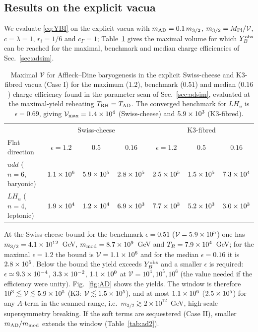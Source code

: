 \documentclass[11pt]{article}
\newcommand{\MP}{M_{\rm Pl}}
\begin{document}
\subsection{Results on the explicit vacua}
We evaluate \eqref{eq:YBI} on the explicit vacua with $m_{\rm AD}=0.1\,m_{3/2}$, $m_{3/2}=\MP/\mathcal V$, $c=\lambda=1$, $r_i=1/6$ and $c_\Gamma=1$; Table~\ref{tab:ad} gives the maximal volume for which $Y_B^{\rm obs}$ can be reached for the maximal, benchmark and median charge efficiencies of Sec.~\ref{sec:adsim}.
\begin{table}[t]
\centering\scriptsize
\begin{tabular}{l|ccc|ccc}
\toprule
 & \multicolumn{3}{c|}{Swiss-cheese} & \multicolumn{3}{c}{K3-fibred}\\
Flat direction & $\epsilon=1.2$ & $0.5$ & $0.16$ & $\epsilon=1.2$ & $0.5$ & $0.16$\\
\midrule
$udd$ ($n=6$, baryonic) & $1.1\times10^{6}$ & $5.9\times10^{5}$ & $2.8\times10^{5}$ & $2.5\times10^{5}$ & $1.5\times10^{5}$ & $7.3\times10^{4}$\\
$LH_u$ ($n=4$, leptonic) & $1.9\times10^{4}$ & $1.2\times10^{4}$ & $6.9\times10^{3}$ & $7.7\times10^{3}$ & $5.2\times10^{3}$ & $3.0\times10^{3}$\\
\bottomrule
\end{tabular}
\caption{Maximal $\mathcal V$ for Affleck--Dine baryogenesis in the explicit Swiss-cheese and K3-fibred vacua (Case I) for the maximum ($1.2$), benchmark ($0.51$) and median ($0.16$) charge efficiency found in the parameter scan of Sec.~\ref{sec:adsim}, evaluated at the maximal-yield reheating $T_{\rm RH}=T_{\rm AD}$. The converged benchmark for $LH_u$ is $\epsilon=0.69$, giving $\mathcal V_{\max}=1.4\times10^{4}$ (Swiss-cheese) and $5.9\times10^{3}$ (K3-fibred).}\label{tab:ad}
\end{table}
At the Swiss-cheese bound for the benchmark $\epsilon=0.51$ ($\mathcal V=5.9\times10^{5}$) one has $m_{3/2}=4.1\times10^{12}$~GeV, $m_{\rm mod}=8.7\times10^{9}$~GeV and $T_R=7.9\times10^{4}$~GeV; for the maximal $\epsilon=1.2$ the bound is $\mathcal V=1.1\times10^{6}$ and for the median $\epsilon=0.16$ it is $2.8\times10^{5}$. Below the bound the yield exceeds $Y_B^{\rm obs}$ and a smaller $\epsilon$ is required: $\epsilon\simeq9.3\times10^{-4}$, $3.3\times10^{-2}$, $1.1\times10^{0}$ at $\mathcal V=10^4,10^5,10^6$ (the value needed if the efficiency were unity). Fig.~\ref{fig:AD} shows the yields. The window is therefore $10^{3}\lesssim\mathcal V\lesssim5.9\times10^{5}$ (K3: $\mathcal V\lesssim1.5\times10^{5}$), and at most $1.1\times10^{6}$ ($2.5\times10^{5}$) for any $A$-term in the scanned range, i.e.\ $m_{3/2}\gtrsim2\times10^{12}$~GeV, high-scale supersymmetry breaking. If the soft terms are sequestered (Case II), smaller $m_{\rm AD}/m_{\rm mod}$ extends the window (Table~\ref{tab:ad2}).
\end{document}
